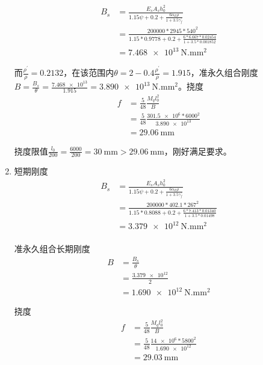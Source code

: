 \begin{enumerate}
\begin{align*}
              B_s & = \frac{E_sA_sh_0^2}{1.15\psi+0.2+\frac{6\alpha_E\rho}{1+3.5\gamma_f^\prime}}      \\
                  & = \frac{200000*2945*540^2}{1.15*0.9778+0.2+\frac{6*6.667*0.02454}{1+3.5*0.001852}} \\
                  & = \SI{7.468e13}{\N.\mm^2}
          \end{align*}
          \par 而$\frac{\rho^\prime}{\rho}=0.2132$，在该范围内$\theta=2-0.4\frac{\rho^\prime}{\rho}=1.915$，准永久组合刚度$B=\frac{B_s}{\theta}=\frac{\num{7.468e13}}{1.915}=\SI{3.890e13}{\N.\mm^2}$。挠度
          \begin{align*}
              f & = \frac{5}{48}\frac{M_ql_0^2}{B}                          \\
                & = \frac{5}{48}\frac{\num{301.5e6}*6000^2}{\num{3.890e13}} \\
                & = \SI{29.06}{\mm}
          \end{align*}
          \par 挠度限值$\frac{l_0}{200}=\frac{6000}{200}=\SI{30}{\mm}>\SI{29.06}{\mm}$，刚好满足要求。
    \item 短期刚度
          \begin{align*}
              B_s & = \frac{E_sA_sh_0^2}{1.15\psi+0.2+\frac{6\alpha_E\rho}{1+3.5\gamma_f^\prime}}      \\
                  & = \frac{200000*402.1*267^2}{1.15*0.8088+0.2+\frac{6*7.413*0.01340}{1+3.5*0.01498}} \\
                  & = \SI{3.379e12}{\N.\mm^2}                                                          \\
          \end{align*}
          \par 准永久组合长期刚度
          \begin{align*}
              B & = \frac{B_s}{\theta}       \\
                & = \frac{\num{3.379e12}}{2} \\
                & = \SI{1.690e12}{\N.\mm^2}
          \end{align*}
          \par 挠度
          \begin{align*}
              f & = \frac{5}{48} \frac{M_ql_0^2}{B}                       \\
                & = \frac{5}{48} \frac{\num{14e6}*5800^2}{\num{1.690e12}} \\
                & = \SI{29.03}{\mm}

\end{align*}
\end{enumerate}
